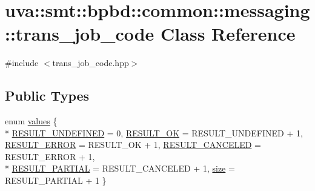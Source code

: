 \hypertarget{classuva_1_1smt_1_1bpbd_1_1common_1_1messaging_1_1trans__job__code}{}\section{uva\+:\+:smt\+:\+:bpbd\+:\+:common\+:\+:messaging\+:\+:trans\+\_\+job\+\_\+code Class Reference}
\label{classuva_1_1smt_1_1bpbd_1_1common_1_1messaging_1_1trans__job__code}


{\ttfamily \#include $<$trans\+\_\+job\+\_\+code.\+hpp$>$}

\subsection*{Public Types}
\begin{DoxyCompactItemize}
\item 
enum \hyperlink{classuva_1_1smt_1_1bpbd_1_1common_1_1messaging_1_1trans__job__code_af641dab8b5a194daece857d972f5351f}{values} \{ \\*
\hyperlink{classuva_1_1smt_1_1bpbd_1_1common_1_1messaging_1_1trans__job__code_af641dab8b5a194daece857d972f5351fa3733780325b11ee9dfe03569b56f7cfa}{R\+E\+S\+U\+L\+T\+\_\+\+U\+N\+D\+E\+F\+I\+N\+E\+D} = 0, 
\hyperlink{classuva_1_1smt_1_1bpbd_1_1common_1_1messaging_1_1trans__job__code_af641dab8b5a194daece857d972f5351fa42d738642764ef67bdee43ad6d92efea}{R\+E\+S\+U\+L\+T\+\_\+\+O\+K} = R\+E\+S\+U\+L\+T\+\_\+\+U\+N\+D\+E\+F\+I\+N\+E\+D + 1, 
\hyperlink{classuva_1_1smt_1_1bpbd_1_1common_1_1messaging_1_1trans__job__code_af641dab8b5a194daece857d972f5351faaa721a0ec3217a4248932b03065fd290}{R\+E\+S\+U\+L\+T\+\_\+\+E\+R\+R\+O\+R} = R\+E\+S\+U\+L\+T\+\_\+\+O\+K + 1, 
\hyperlink{classuva_1_1smt_1_1bpbd_1_1common_1_1messaging_1_1trans__job__code_af641dab8b5a194daece857d972f5351fa0b5251fd3a50d63861d6ffdc2c1005e3}{R\+E\+S\+U\+L\+T\+\_\+\+C\+A\+N\+C\+E\+L\+E\+D} = R\+E\+S\+U\+L\+T\+\_\+\+E\+R\+R\+O\+R + 1, 
\\*
\hyperlink{classuva_1_1smt_1_1bpbd_1_1common_1_1messaging_1_1trans__job__code_af641dab8b5a194daece857d972f5351fad8175f268ab05068fd325a700c0474fe}{R\+E\+S\+U\+L\+T\+\_\+\+P\+A\+R\+T\+I\+A\+L} = R\+E\+S\+U\+L\+T\+\_\+\+C\+A\+N\+C\+E\+L\+E\+D + 1, 
\hyperlink{classuva_1_1smt_1_1bpbd_1_1common_1_1messaging_1_1trans__job__code_af641dab8b5a194daece857d972f5351fa1d0b95aa6b3affd97a603a811e5b3759}{size} = R\+E\+S\+U\+L\+T\+\_\+\+P\+A\+R\+T\+I\+A\+L + 1
 \}
\end{DoxyCompactItemize}
